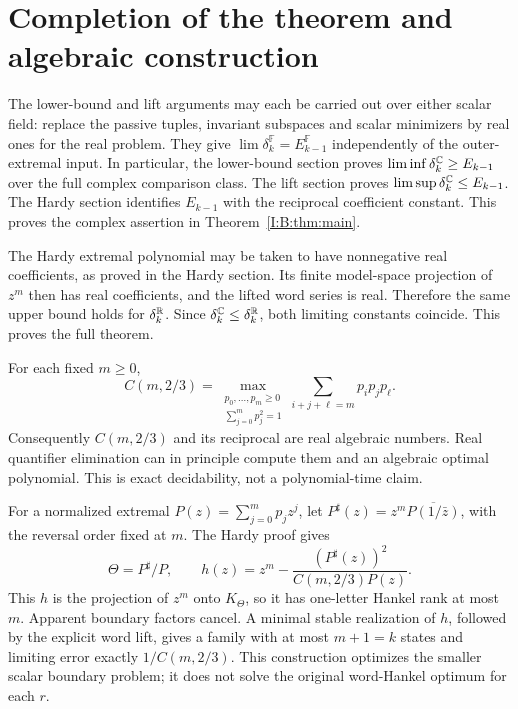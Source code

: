 \section{Completion of the theorem and algebraic construction}
The lower-bound and lift arguments may each be carried out over either scalar field: replace the passive tuples, invariant subspaces and scalar minimizers by real ones for the real problem. They give $\lim\delta_k^{\mathbb F}=E_{k-1}^{\mathbb F}$ independently of the outer-extremal input. In particular, the lower-bound section proves $\liminf\delta_k^{\mathbb C}\ge E_{k-1}$ over the full complex comparison class. The lift section proves $\limsup\delta_k^{\mathbb C}\le E_{k-1}$. The Hardy section identifies $E_{k-1}$ with the reciprocal coefficient constant. This proves the complex assertion in Theorem~\ref{I:B:thm:main}.

The Hardy extremal polynomial may be taken to have nonnegative real coefficients, as proved in the Hardy section. Its finite model-space projection of $z^m$ then has real coefficients, and the lifted word series is real. Therefore the same upper bound holds for $\delta_k^{\mathbb R}$. Since $\delta_k^{\mathbb C}\le\delta_k^{\mathbb R}$, both limiting constants coincide. This proves the full theorem.

\begin{corollary}
For each fixed $m\ge0$,
\[
C(m,2/3)=
\max_{\substack{p_0,\ldots,p_m\ge0\\\sum_{j=0}^m p_j^2=1}}
\sum_{i+j+\ell=m}p_i p_j p_\ell.
\]
Consequently $C(m,2/3)$ and its reciprocal are real algebraic numbers. Real quantifier elimination can in principle compute them and an algebraic optimal polynomial. This is exact decidability, not a polynomial-time claim.
\end{corollary}


For a normalized extremal $P(z)=\sum_{j=0}^m p_jz^j$, let
$P^{\sharp}(z)=z^m\overline{P(1/\bar z)}$, with the reversal order fixed at $m$. The Hardy proof gives
\[
\Theta=P^{\sharp}/P,\qquad
h(z)=z^m-\frac{(P^{\sharp}(z))^2}{C(m,2/3)P(z)}.
\]
This $h$ is the projection of $z^m$ onto $K_\Theta$, so it has one-letter Hankel rank at most $m$. Apparent boundary factors cancel. A minimal stable realization of $h$, followed by the explicit word lift, gives a family with at most $m+1=k$ states and limiting error exactly $1/C(m,2/3)$. This construction optimizes the smaller scalar boundary problem; it does not solve the original word-Hankel optimum for each $r$.

